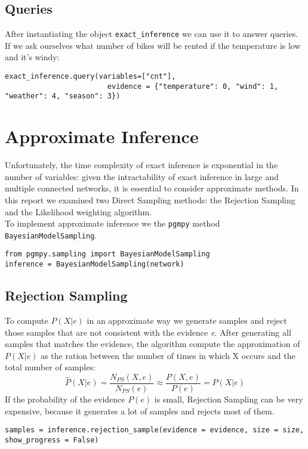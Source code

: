 \documentclass[letterpaper,11pt]{article}
\begin{document}
\subsection*{Queries}
After instantiating the object \texttt{exact\_inference} we can use it to answer queries. If we ask ourselves what number of bikes will be rented if the temperature is low and it's windy:
\begin{lstlisting}
exact_inference.query(variables=["cnt"], 
						evidence = {"temperature": 0, "wind": 1, "weather": 4, "season": 3})
\end{lstlisting}

\section{Approximate Inference}
Unfortunately, the time complexity of exact inference is exponential in the number of variables: given the intractability of exact inference in large and multiple connected networks, it is essential to consider approximate methods. In this report we examined two Direct Sampling methods: the Rejection Sampling and the Likelihood weighting algorithm. \\ To implement approximate inference we the \texttt{pgmpy} method \texttt{BayesianModelSampling}. 
\begin{lstlisting}
from pgmpy.sampling import BayesianModelSampling
inference = BayesianModelSampling(network)
\end{lstlisting}


\subsection{Rejection Sampling}
To compute $P(X| e)$ in an approximate way we generate samples and reject those samples that are not consistent with the evidence \textit{e}. After generating all samples that matches the evidence, the algorithm compute the approximation of $P(X| e)$ as the ration between the number of times in which X occurs and the total number of samples:
\begin{equation}
\widehat{P}(X| e)= \frac{N_{PS}(X, e)}{N_{PS}(e)} \approx \frac{P(X, e)}{P(e)} = P(X| e)
\end{equation}
If the probability of the evidence $P(e)$ is small, Rejection Sampling can be very expensive, because it generates a lot of samples and rejects most of them.
\begin{lstlisting}
samples = inference.rejection_sample(evidence = evidence, size = size, show_progress = False)
\end{lstlisting}
\end{document}
